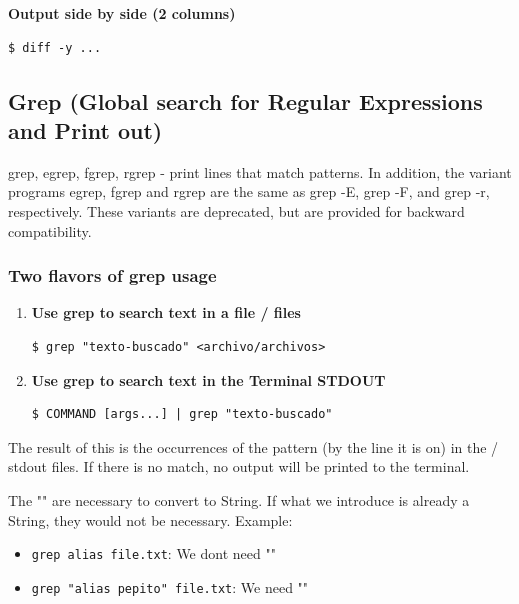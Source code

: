 \documentclass{article}
\newenvironment{blocktemplate}[1]{%
    \tcolorbox[beamer,%
    noparskip,breakable,
    colframe=Blue,%
    colbacklower=LimeGreen!75!LightGreen,%
    title=#1]}%
    {\endtcolorbox}
\newenvironment{blocktemplateII}[1]{%
    \tcolorbox[beamer,%
    noparskip,breakable,
    colframe=Green,%
    colbacklower=LimeGreen!75!LightGreen,%
    title=#1]}%
    {\endtcolorbox}
\newenvironment{codetemplate}[1][]{%
  \mybasecolorbox[#1]
  \itshape
}{%
  \endmybasecolorbox
}
\begin{document}
\textbf{Output side by side (2 columns)}
\begin{codetemplate}{}
\begin{verbatim}
$ diff -y ...
\end{verbatim}
\end{codetemplate}

\subsection{Grep (Global search for Regular Expressions and Print out)}

\begin{blocktemplate}{Nota}
grep, egrep, fgrep, rgrep - print lines that match patterns.
In addition, the variant programs egrep, fgrep and rgrep are the same as grep -E, grep -F, and grep -r, respectively.  These variants are deprecated, but are provided for backward compatibility.
\end{blocktemplate}

\subsubsection{Two flavors of grep usage}
\begin{enumerate}
    \item \textbf{Use grep to search text in a file / files}
\begin{codetemplate}{}
\begin{verbatim}
$ grep "texto-buscado" <archivo/archivos>
\end{verbatim}
\end{codetemplate}

    \item \textbf{Use grep to search text in the Terminal STDOUT}
\begin{codetemplate}{}
\begin{verbatim}
$ COMMAND [args...] | grep "texto-buscado"
\end{verbatim}
\end{codetemplate}
\end{enumerate}
The result of this is the occurrences of the pattern (by the line it is on) in the / stdout files. If there is no match, no output will be printed to the terminal.

\begin{blocktemplateII}{Note}
    The "" are necessary to convert to String. If what we introduce is already a String, they would not be necessary. Example:
\begin{itemize}
    \item \verb|grep alias file.txt|: We dont need ""
    \item \verb|grep "alias pepito" file.txt|: We need ""
\end{itemize}
\end{blocktemplateII}
\end{document}
